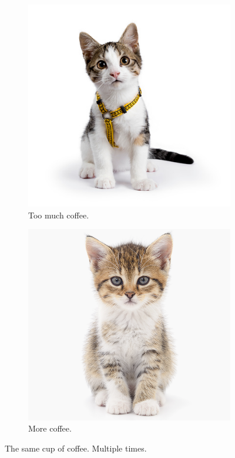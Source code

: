 \documentclass[12pt]{article}
\begin{document}
\begin{figure}[t!]
\begin{subfigure}[b]{0.5\linewidth}
    \includegraphics[width=\linewidth]{./kitten5.jpg}
    \caption{Too much coffee.}
  \end{subfigure}
  \begin{subfigure}[b]{0.4\linewidth}
    \includegraphics[width=\linewidth]{./kitten1.png}
    \caption{More coffee.}
  \end{subfigure}
  \caption{The same cup of coffee. Multiple times.}
  \label{fig:coffee3}
\end{figure}
\end{document}
